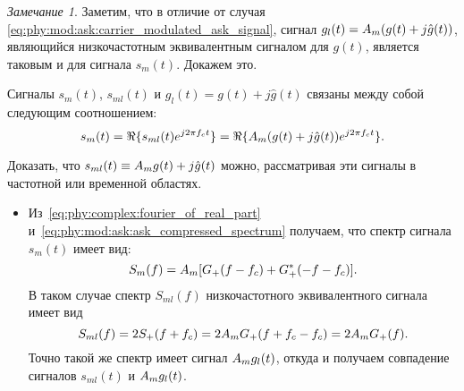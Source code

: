 \documentclass{book}
\numberwithin{theorem}{chapter}
\numberwithin{statement}{chapter}
\numberwithin{lemma}{chapter}
\theoremstyle{definition}
\numberwithin{task}{chapter}
\theoremstyle{remark}
\numberwithin{example}{chapter}
\theoremstyle{definition}
\numberwithin{definition}{chapter}
\theoremstyle{remark}
\newtheorem{note}{Замечание}
\theoremstyle{remark}
\numberwithin{lyrics}{section}
\begin{document}
\begin{note}
	Заметим, что в отличие от случая \eqref{eq:phy:mod:ask:carrier_modulated_ask_signal}, сигнал $g_{l}(t) = A_m (g(t) + j \hat{g}(t))$, являющийся низкочастотным эквивалентным сигналом для $g(t)$, является таковым и для сигнала $s_m(t)$. Докажем это.
	
	Сигналы $s_m(t)$, $s_{ml}(t)$ и $g_{l}(t) = g(t) + j\hat{g}(t)$ связаны между собой следующим соотношением:
	\begin{equation}
	\label{eq:phy:mod:ask:ask_compressed_spectrum}
	s_m(t) = \Re\{s_{ml}(t)e^{j2\pi f_c t}\} = \Re\{A_m (g(t) + j \hat{g}(t)) e^{j2\pi f_c t}\}.
	\end{equation}
	
	Доказать, что $s_{ml}(t) \equiv A_m g(t) + j \hat{g}(t)$ можно, рассматривая эти сигналы в частотной или временной областях.
	\begin{itemize}
		\item Из~\eqref{eq:phy:complex:fourier_of_real_part} и~\eqref{eq:phy:mod:ask:ask_compressed_spectrum} получаем, что спектр сигнала $s_m(t)$ имеет вид:
		\begin{equation}
		S_m(f) = A_m [G_+(f - f_c) + G_+^*(-f - f_c)].
		\end{equation}
		В таком случае спектр $S_{ml}(f)$ низкочастотного эквивалентного сигнала имеет вид
		\begin{equation}
		\notag
		S_{ml}(f) = 2 S_+(f + f_c) = 2 A_m G_+(f + f_c - f_c) = 2 A_m G_+(f).
		\end{equation}
		Точно такой же спектр имеет сигнал $A_m g_l(t)$, откуда и получаем совпадение сигналов $s_{ml}(t)$ и $A_m g_l(t)$.
		

\end{itemize}
\end{note}
\end{document}
